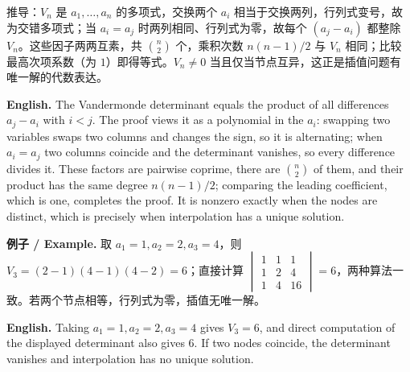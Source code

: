 \documentclass[UTF8,11pt,a4paper]{ctexart}
\newcommand{\EN}[1]{\par\noindent\textbf{English.} #1\par}
\newcommand{\EX}[2]{\par\noindent\textbf{例子 / Example.} #1\par\EN{#2}}
\begin{document}
推导：$V_n$ 是 $a_1,\dots,a_n$ 的多项式，交换两个 $a_i$ 相当于交换两列，行列式变号，故为交错多项式；当 $a_i=a_j$ 时两列相同、行列式为零，故每个 $(a_j-a_i)$ 都整除 $V_n$。这些因子两两互素，共 $\binom n2$ 个，乘积次数 $n(n-1)/2$ 与 $V_n$ 相同；比较最高次项系数（为 $1$）即得等式。$V_n\ne0$ 当且仅当节点互异，这正是插值问题有唯一解的代数表达。
\EN{The Vandermonde determinant equals the product of all differences $a_j-a_i$ with $i<j$. The proof views it as a polynomial in the $a_i$: swapping two variables swaps two columns and changes the sign, so it is alternating; when $a_i=a_j$ two columns coincide and the determinant vanishes, so every difference divides it. These factors are pairwise coprime, there are $\binom n2$ of them, and their product has the same degree $n(n-1)/2$; comparing the leading coefficient, which is one, completes the proof. It is nonzero exactly when the nodes are distinct, which is precisely when interpolation has a unique solution.}
\EX{取 $a_1=1,a_2=2,a_3=4$，则 $V_3=(2-1)(4-1)(4-2)=6$；直接计算 $\begin{vmatrix}1&1&1\\1&2&4\\1&4&16\end{vmatrix}=6$，两种算法一致。若两个节点相等，行列式为零，插值无唯一解。}{Taking $a_1=1,a_2=2,a_3=4$ gives $V_3=6$, and direct computation of the displayed determinant also gives $6$. If two nodes coincide, the determinant vanishes and interpolation has no unique solution.}
\end{document}
